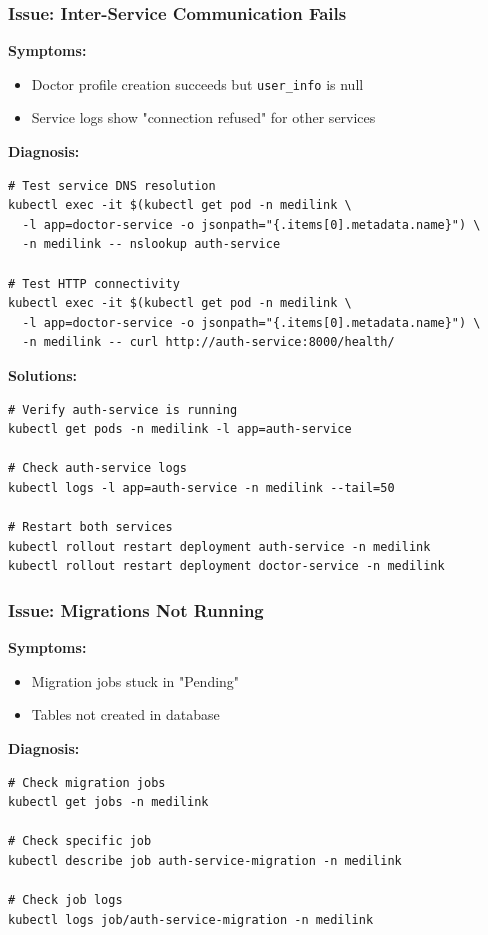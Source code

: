 \documentclass[12pt,a4paper]{article}
\begin{document}
\subsubsection{Issue: Inter-Service Communication Fails}

\textbf{Symptoms:}
\begin{itemize}
    \item Doctor profile creation succeeds but \texttt{user\_info} is null
    \item Service logs show "connection refused" for other services
\end{itemize}

\textbf{Diagnosis:}
\begin{lstlisting}[style=bash]
# Test service DNS resolution
kubectl exec -it $(kubectl get pod -n medilink \
  -l app=doctor-service -o jsonpath="{.items[0].metadata.name}") \
  -n medilink -- nslookup auth-service

# Test HTTP connectivity
kubectl exec -it $(kubectl get pod -n medilink \
  -l app=doctor-service -o jsonpath="{.items[0].metadata.name}") \
  -n medilink -- curl http://auth-service:8000/health/
\end{lstlisting}

\textbf{Solutions:}
\begin{lstlisting}[style=bash]
# Verify auth-service is running
kubectl get pods -n medilink -l app=auth-service

# Check auth-service logs
kubectl logs -l app=auth-service -n medilink --tail=50

# Restart both services
kubectl rollout restart deployment auth-service -n medilink
kubectl rollout restart deployment doctor-service -n medilink
\end{lstlisting}

\subsubsection{Issue: Migrations Not Running}

\textbf{Symptoms:}
\begin{itemize}
    \item Migration jobs stuck in "Pending"
    \item Tables not created in database
\end{itemize}

\textbf{Diagnosis:}
\begin{lstlisting}[style=bash]
# Check migration jobs
kubectl get jobs -n medilink

# Check specific job
kubectl describe job auth-service-migration -n medilink

# Check job logs
kubectl logs job/auth-service-migration -n medilink
\end{lstlisting}
\end{document}
